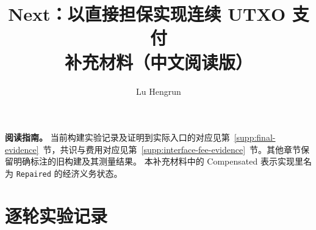 \documentclass[letterpaper,11pt,onecolumn,journal]{IEEEtran}
\title{Next：以直接担保实现连续 UTXO 支付\\补充材料（中文阅读版）}
\author{Lu Hengrun}
\begin{document}
\maketitle
\noindent\textbf{阅读指南。} 当前构建实验记录及证明到实际入口的对应见第~\ref{supp:final-evidence}~节，共识与费用对应见第~\ref{supp:interface-fee-evidence}~节。其他章节保留明确标注的旧构建及其测量结果。 本补充材料中的 Compensated 表示实现里名为 \texttt{Repaired} 的经济义务状态。








\clearpage
\section{逐轮实验记录}



\end{document}
